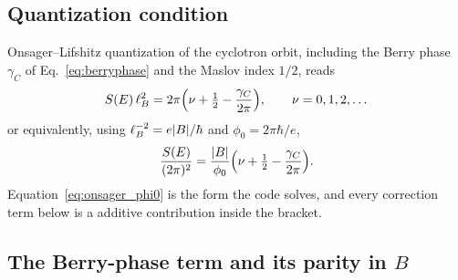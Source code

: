 \documentclass[11pt]{article}
\newcommand{\Bfield}{B}
\newcommand{\lB}{\ell_B}
\begin{document}
\subsection{Quantization condition}

Onsager--Lifshitz quantization of the cyclotron orbit, including the
Berry phase $\gamma_C$ of Eq.~\eqref{eq:berryphase} and the Maslov index
$1/2$, reads
\begin{equation}\label{eq:onsager_textbook}
  S(E)\,\lB^2 = 2\pi\Bigl( \nu + \tfrac12 - \frac{\gamma_C}{2\pi} \Bigr),
  \qquad \nu = 0,1,2,\dots
\end{equation}
or equivalently, using $\lB^{-2} = e\abs{\Bfield}/\hbar$ and
$\phi_0 = 2\pi\hbar/e$,
\begin{equation}\label{eq:onsager_phi0}
  \frac{S(E)}{(2\pi)^2}
  = \frac{\abs{\Bfield}}{\phi_0}
    \Bigl( \nu + \tfrac12 - \frac{\gamma_C}{2\pi} \Bigr).
\end{equation}
Equation~\eqref{eq:onsager_phi0} is the form the code solves, and every
correction term below is a additive contribution inside the bracket.

\subsection{The Berry-phase term and its parity in \texorpdfstring{$\Bfield$}{B}}
\label{sec:parity}
\end{document}
